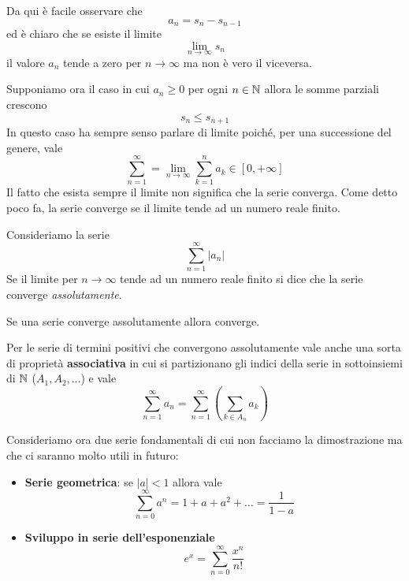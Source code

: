 \begin{observation}
	Da qui è facile osservare che
	\[ a_n = s_n - s_{n-1} \]
	ed è chiaro che se esiste il limite
	\[ \lim_{n \to \infty} s_n \]
	il valore $a_n$ tende a zero per $n \to \infty$ ma non è vero il viceversa.
\end{observation}

Supponiamo ora il caso in cui $a_n \geq 0$ per ogni $n \in \mathbb{N}$ allora le somme parziali crescono
\[ s_n \leq s_{n+1} \]
In questo caso ha sempre senso parlare di limite poiché, per una successione del genere, vale
\[ \sum_{n=1}^\infty = \lim_{n \to \infty} \sum_{k=1}^n a_k \in [0, +\infty]  \]
Il fatto che esista sempre il limite non significa che la serie converga. Come detto poco fa, la
serie converge se il limite tende ad un numero reale finito.

\begin{definition}
	Consideriamo la serie
	\[ \sum_{n=1}^\infty |a_n| \]
	Se il limite per $n \to \infty$ tende ad un numero reale finito si dice che la serie converge
	\emph{assolutamente}.
\end{definition}

\begin{theorem}
	Se una serie converge assolutamente allora converge.
\end{theorem}

Per le serie di termini positivi che convergono assolutamente vale anche una sorta di proprietà
\textbf{associativa} in cui si partizionano gli indici della serie in sottoinsiemi di $\mathbb{N}$
($A_1, A_2, \dots$) e vale
\[ \sum_{n=1}^\infty a_n = \sum_{n=1}^\infty \left( \sum_{k \in A_n} a_k \right) \]

Consideriamo ora due serie fondamentali di cui non facciamo la dimostrazione ma che ci saranno
molto utili in futuro:
\begin{itemize}
	\item \textbf{Serie geometrica}: se $|a| < 1$ allora vale
	      \[ \sum_{n=0}^\infty a^n = 1 + a + a^2 + \dots = \frac{1}{1 - a} \]
	\item \textbf{Sviluppo in serie dell'esponenziale}
	      \[ e^x = \sum_{n=0}^\infty \frac{x^n}{n!} \]
\end{itemize}
